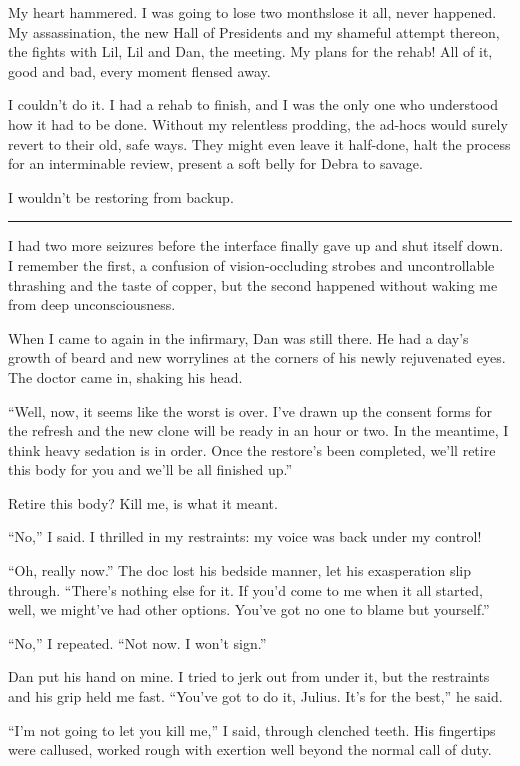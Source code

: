My heart hammered. I was going to lose two months{\dash}lose it all,
never happened. My assassination, the new Hall of Presidents and my
shameful attempt thereon, the fights with Lil, Lil and Dan, the
meeting. My plans for the rehab! All of it, good and bad, every
moment flensed away.

I couldn't do it. I had a rehab to finish, and I was the only one
who understood how it had to be done. Without my relentless
prodding, the ad-hocs would surely revert to their old, safe ways.
They might even leave it half-done, halt the process for an
interminable review, present a soft belly for Debra to savage.

I wouldn't be restoring from backup.

\begin{center}\rule{3in}{0.4pt}\end{center}

I had two more seizures before the interface finally gave up and
shut itself down. I remember the first, a confusion of
vision-occluding strobes and uncontrollable thrashing and the taste
of copper, but the second happened without waking me from deep
unconsciousness.

When I came to again in the infirmary, Dan was still there. He had
a day's growth of beard and new worrylines at the corners of his
newly rejuvenated eyes. The doctor came in, shaking his head.

“Well, now, it seems like the worst is over. I've drawn up the
consent forms for the refresh and the new clone will be ready in an
hour or two. In the meantime, I think heavy sedation is in order.
Once the restore's been completed, we'll retire this body for you
and we'll be all finished up.”

Retire this body? Kill me, is what it meant.

“No,” I said. I thrilled in my restraints: my voice was back under
my control!

“Oh, really now.” The doc lost his bedside manner, let his
exasperation slip through. “There's nothing else for it. If you'd
come to me when it all started, well, we might've had other
options. You've got no one to blame but yourself.”

“No,” I repeated. “Not now. I won't sign.”

Dan put his hand on mine. I tried to jerk out from under it, but
the restraints and his grip held me fast. “You've got to do it,
Julius. It's for the best,” he said.

“I'm not going to let you kill me,” I said, through clenched teeth.
His fingertips were callused, worked rough with exertion well
beyond the normal call of duty.

